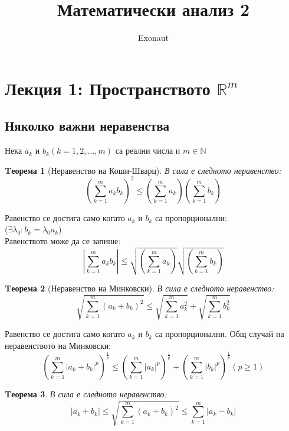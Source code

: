 \documentclass[a4paper,fleqn,12pt]{article}
\title{Математически анализ 2}
\author{Exonaut}
\newtheorem{theorem}{Tеорема}[subsection]
\theoremstyle{definition}
\begin{document}
\maketitle

\newpage
{}

\tableofcontents
\newpage

\section{Лекция 1: Пространството $\mathbb{R}^m$}

\subsection{Няколко важни неравенства}
Нека $a_k $ и $b_k (k = 1, 2, ..., m) $ са реални числа и $m \in \mathbb{N}$
\begin{theorem}[Неравенство на Коши-Шварц]
В сила е следното неравенство: \\
$$\left( \sum_{k=1}^{m}a_kb_k \right ) ^ 2   \leq  \left( \sum_{k=1}^{m}a_k \right)  \left( \sum_{k=1}^{m}b_k  \right) $$
\end{theorem}
Равенство се достига само когато $a_k$ и $b_k$ са пропорционални:\\
 ($\exists \lambda_0: b_k =\lambda_0 a_k  $)\\
Равенството може да се запише: 
$$\displaystyle\left\lvert \sum_{k=1}^{m}a_kb_k \right \rvert \leq \sqrt{\left( \sum_{k=1}^{m}a_k \right)}  \sqrt{ \left( \sum_{k=1}^{m}b_k  \right)} $$

\begin{theorem}[Неравенство на Минковски]
В сила е следното неравенство: \\
$$\sqrt{ \sum_{k=1}^{m} (a_k + b_k)^2}   \leq \sqrt{ \sum_{k=1}^{m}a_k^2 } + \sqrt{ \sum_{k=1}^{m}b_k^2 }$$
\end{theorem}
Равенство се достига само когато $a_k$ и $b_k$ са пропорционални.
Общ случай на неравенството на Минковски:
$$\left ( \sum_{k=1}^{m} \vert a_k + b_k\vert ^p \right)^\frac{1}{p}   \leq\left ( \sum_{k=1}^{m}\vert a_k\vert ^p\right)^\frac{1}{p} + \left ( \sum_{k=1}^{m} \vert b_k\vert ^p \right)^\frac{1}{p}   ( p\geq 1)$$

\begin{theorem}
В сила е следното неравенство: \\
$$ \vert a_k + b_k\vert   \leq \sqrt{ \sum_{k=1}^{m} (a_k + b_k)^2} \leq   \sum_{k=1}^{m}\vert a_k - b_k\vert  $$
\end{theorem}
\end{document}
